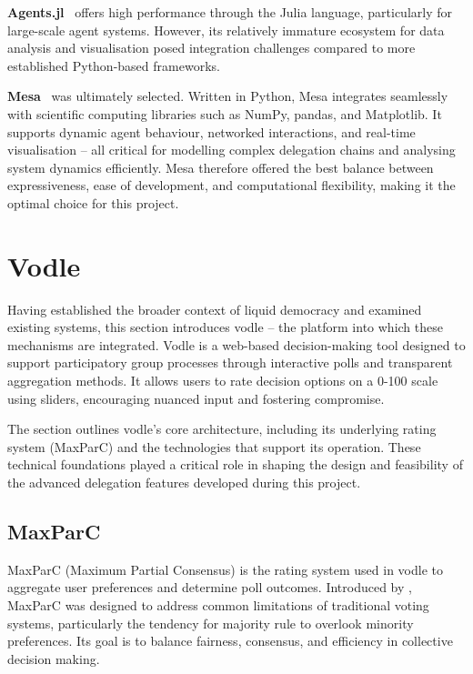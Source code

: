 \textbf{Agents.jl}~\citep{agentsjl} offers high performance through the Julia language, particularly for large-scale agent systems. However, its relatively immature ecosystem for data analysis and visualisation posed integration challenges compared to more established Python-based frameworks.

\textbf{Mesa}~\citep{kazil_utilizing_2020} was ultimately selected. Written in Python, Mesa integrates seamlessly with scientific computing libraries such as NumPy, pandas, and Matplotlib. It supports dynamic agent behaviour, networked interactions, and real-time visualisation -- all critical for modelling complex delegation chains and analysing system dynamics efficiently. Mesa therefore offered the best balance between expressiveness, ease of development, and computational flexibility, making it the optimal choice for this project.

\section{Vodle}
Having established the broader context of liquid democracy and examined existing systems, this section introduces vodle -- the platform into which these mechanisms are integrated.
Vodle is a web-based decision-making tool designed to support participatory group processes through interactive polls and transparent aggregation methods. It allows users to rate decision options on a 0-100 scale using sliders, encouraging nuanced input and fostering compromise.

The section outlines vodle's core architecture, including its underlying rating system (MaxParC) and the technologies that support its operation. These technical foundations played a critical role in shaping the design and feasibility of the advanced delegation features developed during this project.

\subsection{MaxParC}\label{subsec:background_maxparc}
MaxParC (Maximum Partial Consensus) is the rating system used in vodle to aggregate user preferences and determine poll outcomes. Introduced by \citet{heitzig_fair_2024}, MaxParC was designed to address common limitations of traditional voting systems, particularly the tendency for majority rule to overlook minority preferences. Its goal is to balance fairness, consensus, and efficiency in collective decision making.

